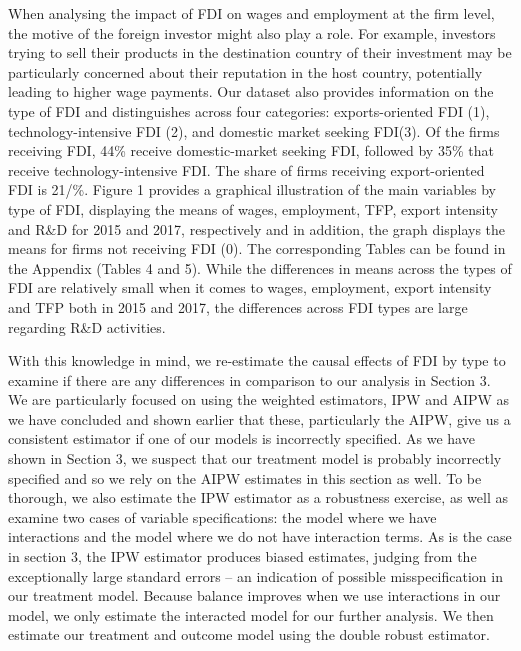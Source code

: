 \documentclass[11pt,a4paper,leqno]{article}
\begin{document}
When analysing the impact of FDI on wages and employment at the firm level, the motive of the foreign investor might also play a role. For example, investors trying to sell their products in the destination country of their investment may be particularly concerned about their reputation in the host country, potentially leading to higher wage payments. Our dataset also provides information on the type of FDI and distinguishes across four categories: exports-oriented FDI (1), technology-intensive FDI (2), and domestic market seeking FDI(3). Of the firms receiving FDI, 44\% receive domestic-market seeking FDI, followed by 35\% that receive technology-intensive FDI. The share of firms receiving export-oriented FDI is 21/\%. Figure 1 provides a graphical illustration of the main variables by type of FDI, displaying the means of wages, employment, TFP, export intensity and R\&D for 2015 and 2017, respectively and in addition, the graph displays the means for firms not receiving FDI (0). The corresponding Tables can be found in the Appendix (Tables 4 and 5). While the differences in means across the types of FDI are relatively small when it comes to wages, employment, export intensity and TFP both in 2015 and 2017, the differences across FDI types are large regarding R\&D activities.

With this knowledge in mind, we re-estimate the causal effects of FDI by type to examine if there are any differences in comparison to our analysis in Section 3. We are particularly focused on using the weighted estimators, IPW and AIPW as we have concluded and shown earlier that these, particularly the AIPW, give us a consistent estimator if one of our models is incorrectly specified. As we have shown in Section 3, we suspect that our treatment model is probably incorrectly specified and so we rely on the AIPW estimates in this section as well. To be thorough, we also estimate the IPW estimator as a robustness exercise, as well as examine two cases of variable specifications: the model where we have interactions and the model where we do not have interaction terms. As is the case in section 3, the IPW estimator produces biased estimates, judging from the exceptionally large standard errors – an indication of possible misspecification in our treatment model. Because balance improves when we use interactions in our model, we only estimate the interacted model for our further analysis.  We then estimate our treatment and outcome model using the double robust estimator. 
\end{document}
